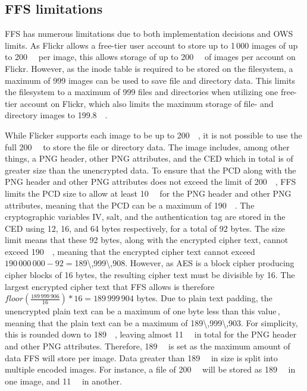 \subsection{FFS limitations}
\label{subsec:ffs_limits}
\gls{FFS} has numerous limitations due to both implementation decisions and \gls{OWS} limits. As Flickr allows a \mbox{free-tier} user account to store up to 1\,000 images of up to \SI{200}{\mega\byte} per image, this allows storage of up to \SI{200}{\giga\byte} of images per account on Flickr. However, as the inode table is required to be stored on the filesystem, a maximum of 999 images can be used to save file and directory data. This limits the filesystem to a maximum of 999 files and directories when utilizing one \mbox{free-tier} account on Flickr, which also limits the maximum storage of file- and directory images to \SI{199.8}{\giga\byte}.

While Flicker supports each image to be up to \SI{200}{\mega\byte}, it is not possible to use the full \SI{200}{\mega\byte} to store the file or directory data. The image includes, among other things, a PNG header, other PNG attributes, and the \gls{CED} which in total is of greater size than the unencrypted data. To ensure that the \gls{PCD} along with the PNG header and other PNG attributes does not exceed the limit of \SI{200}{\mega\byte}, \gls{FFS} limits the \gls{PCD} size to allow at least \SI{10}{\mega\byte} for the PNG header and other PNG attributes, meaning that the \gls{PCD} can be a maximum of \SI{190}{\mega\byte}. The cryptographic variables \gls{IV}, salt, and the authentication tag are stored in the \gls{CED} using 12, 16, and 64 bytes respectively, for a total of 92 bytes. The size limit means that these 92 bytes, along with the encrypted cipher text, cannot exceed \SI{190}{\mega\byte}, meaning that the encrypted cipher text cannot exceed $190\,000\,000 - 92 = $\SI{189\,999\,908}{\byte}. However, as \gls{AES} is a block cipher producing cipher blocks of 16 bytes, the resulting cipher text must be divisible by 16. The largest encrypted cipher text that \gls{FFS} allows is therefore $floor(\frac{189\,999\,906}{16})*16 = 189\,999\,904$ bytes. Due to plain text padding, the unencrypted plain text can be a maximum of one byte less than this value\,\cite{z.z.coderAnswerSizeData2010}, meaning that the plain text can be a maximum of \SI{189\,999\,903}{\byte}. For simplicity, this is rounded down to \SI{189}{\mega\byte}, leaving almost \SI{11}{\mega\byte} in total for the PNG header and other PNG attributes. Therefore, \SI{189}{\mega\byte} is set as the maximum amount of data \gls{FFS} will store per image. Data greater than \SI{189}{\mega\byte} in size is split into multiple encoded images. For instance, a file of \SI{200}{\mega\byte} will be stored as \SI{189}{\mega\byte} in one image, and \SI{11}{\mega\byte} in another. 

